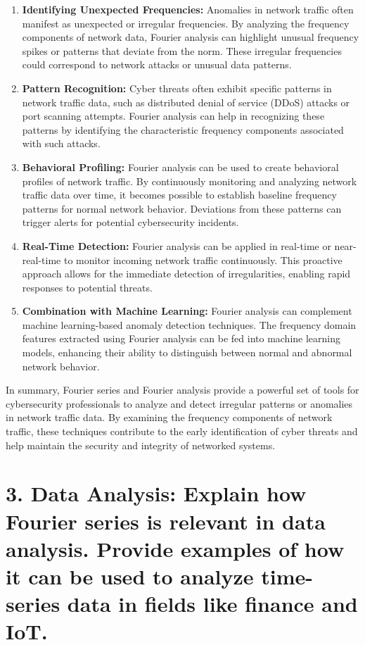 \documentclass[11pt]{article}
\begin{document}
\begin{enumerate}
\def\labelenumi{\arabic{enumi}.}
\item
  \textbf{Identifying Unexpected Frequencies:} Anomalies in network
  traffic often manifest as unexpected or irregular frequencies. By
  analyzing the frequency components of network data, Fourier analysis
  can highlight unusual frequency spikes or patterns that deviate from
  the norm. These irregular frequencies could correspond to network
  attacks or unusual data patterns.
\item
  \textbf{Pattern Recognition:} Cyber threats often exhibit specific
  patterns in network traffic data, such as distributed denial of
  service (DDoS) attacks or port scanning attempts. Fourier analysis can
  help in recognizing these patterns by identifying the characteristic
  frequency components associated with such attacks.
\item
  \textbf{Behavioral Profiling:} Fourier analysis can be used to create
  behavioral profiles of network traffic. By continuously monitoring and
  analyzing network traffic data over time, it becomes possible to
  establish baseline frequency patterns for normal network behavior.
  Deviations from these patterns can trigger alerts for potential
  cybersecurity incidents.
\item
  \textbf{Real-Time Detection:} Fourier analysis can be applied in
  real-time or near-real-time to monitor incoming network traffic
  continuously. This proactive approach allows for the immediate
  detection of irregularities, enabling rapid responses to potential
  threats.
\item
  \textbf{Combination with Machine Learning:} Fourier analysis can
  complement machine learning-based anomaly detection techniques. The
  frequency domain features extracted using Fourier analysis can be fed
  into machine learning models, enhancing their ability to distinguish
  between normal and abnormal network behavior.
\end{enumerate}

In summary, Fourier series and Fourier analysis provide a powerful set
of tools for cybersecurity professionals to analyze and detect irregular
patterns or anomalies in network traffic data. By examining the
frequency components of network traffic, these techniques contribute to
the early identification of cyber threats and help maintain the security
and integrity of networked systems.

    \hypertarget{data-analysis-explain-how-fourier-series-is-relevant-in-data-analysis.-provide-examples-of-how-it-can-be-used-to-analyze-time-series-data-in-fields-like-finance-and-iot.}{%
\section{3. Data Analysis: Explain how Fourier series is relevant in
data analysis. Provide examples of how it can be used to analyze
time-series data in fields like finance and
IoT.}\label{data-analysis-explain-how-fourier-series-is-relevant-in-data-analysis.-provide-examples-of-how-it-can-be-used-to-analyze-time-series-data-in-fields-like-finance-and-iot.}}
\end{document}
